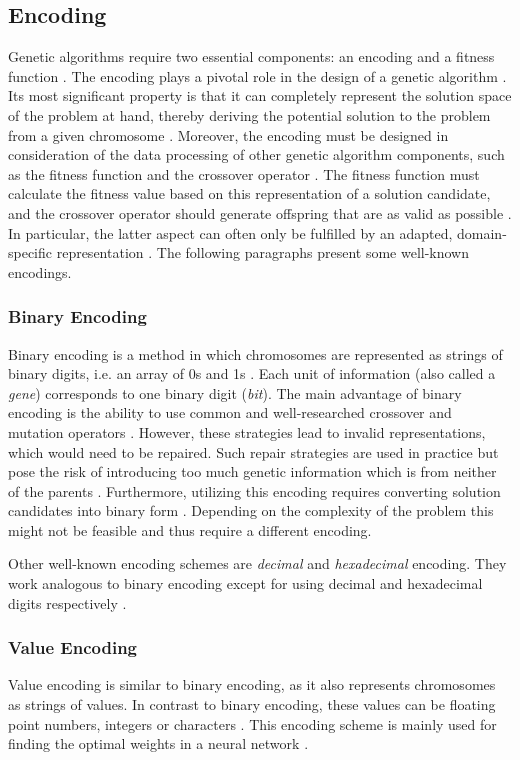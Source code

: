 \documentclass[sigconf]{acmart}
\begin{document}
\subsection{Encoding}
Genetic algorithms require two essential components: an encoding and
a fitness function \cite{Affenzeller2009}.
The encoding plays a pivotal role in the design of a genetic algorithm
\cite{Katoch2021}.
Its most significant property is that it can completely represent the solution
space of the problem at hand, thereby deriving the potential solution to the
problem from a given chromosome \cite{Affenzeller2009}.
Moreover, the encoding must be designed in consideration of the data
processing of other genetic algorithm components, such as the fitness function
and the crossover operator \cite{Affenzeller2009}.
The fitness function must calculate the fitness value based on this
representation of a solution candidate, and the crossover operator should
generate offspring that are as valid as possible \cite{Affenzeller2009}.
In particular, the latter aspect can often only be fulfilled by an adapted,
domain-specific representation \cite{Affenzeller2009}.
%
The following paragraphs present some well-known encodings.

\subsubsection{Binary Encoding}
Binary encoding is a method in which chromosomes are represented as strings
of binary digits, i.e. an array of 0s and 1s \cite{Katoch2021}.
Each unit of information (also called a \textit{gene}) corresponds to one binary
digit (\textit{bit}).
%
The main advantage of binary encoding is the ability to use common and
well-researched crossover and mutation operators \cite{Katoch2021}.
However, these strategies lead to invalid representations, which
would need to be repaired. Such repair strategies are used in practice
but pose the risk of introducing too much genetic information which is from
neither of the parents \cite{Affenzeller2009}.
%
Furthermore, utilizing this encoding requires converting solution candidates
into binary form \cite{Katoch2021}. Depending on the complexity of the problem
this might not be feasible and thus require a different encoding.

Other well-known encoding schemes are \textit{decimal} and \textit{hexadecimal}
encoding. They work analogous to binary encoding except for using decimal and
hexadecimal digits respectively \cite{Katoch2021}.

\subsubsection{Value Encoding}
Value encoding is similar to binary encoding, as it also represents chromosomes
as strings of values. In contrast to binary encoding, these values can be
floating point numbers, integers or characters \cite{Katoch2021}.
This encoding scheme is mainly used for finding the optimal weights in a
neural network \cite{Katoch2021}.
\end{document}
